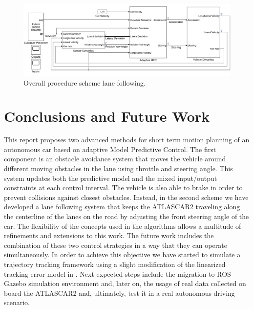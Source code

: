 \documentclass[conference,11pt]{IEEEtran}
\begin{document}
\begin{figure}[!b]
	\centering
	\includegraphics[width=1\textwidth]{./figure/lane_following_AMPC.pdf}
	\caption{Overall procedure scheme lane following.}
	\label{fig:scheme_lane_following}
\end{figure}
\section{Conclusions and Future Work}
This report proposes two advanced methods for short term motion planning of an autonomous car based on adaptive Model Predictive Control. The first component is an obstacle avoidance system that moves the vehicle around different moving obstacles in the lane using throttle and steering angle. This system updates both the predictive model and the mixed input/output constraints at each control interval. The vehicle is also able to brake in order to prevent collisions against closest obstacles. Instead, in the second scheme  we have developed a lane following system that keeps the ATLASCAR2 traveling along the centerline of the lanes on the road by adjusting the front steering angle of the car.  The flexibility of the concepts used in the algorithms allows a multitude of refinements and extensions to this work. The future work includes the combination of these two control strategies in a way that they can operate simultaneously. In order to achieve this objective we have started to simulate a trajectory tracking framework using a slight modification of the linearized tracking error model in \cite{error_model}. Next expected steps include the migration to ROS-Gazebo simulation environment and, later on, the usage of real data collected on board the ATLASCAR2 and, ultimately, test it in a real autonomous driving scenario.


\balance
\end{document}
